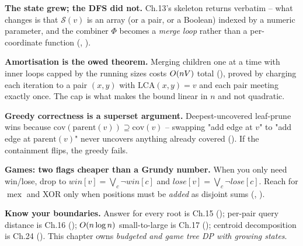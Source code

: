 \begin{quickref}
\textbf{The state grew; the DFS did not.} Ch.13's 
skeleton returns verbatim -- what changes is that $\mathcal S(v)$ is an
array (or a pair, or a Boolean) indexed by a numeric parameter, and the
combiner $\Phi$ becomes a \emph{merge loop} rather than a per-coordinate
function (, ).

\medskip
\textbf{Amortisation is the owed theorem.} Merging children one at a time
with inner loops capped by the running sizes costs $O(nV)$ total
(), proved by charging each iteration to a pair
$(x,y)$ with $\mathrm{LCA}(x,y) = v$ and each pair meeting exactly once.
The cap is what makes the bound linear in $n$ and not quadratic.

\medskip
\textbf{Greedy correctness is a superset argument.} Deepest-uncovered
leaf-prune wins because $\mathrm{cov}(\mathrm{parent}(v)) \supseteq
\mathrm{cov}(v)$ -- swapping "add edge at $v$" to "add edge at
$\mathrm{parent}(v)$" never uncovers anything already covered
(). If the containment flips, the greedy fails.

\medskip
\textbf{Games: two flags cheaper than a Grundy number.} When you only
need win/lose, drop to $\mathit{win}[v] = \bigvee_c \neg\mathit{win}[c]$
and $\mathit{lose}[v] = \bigvee_c \neg\mathit{lose}[c]$. Reach for
$\operatorname{mex}$ and XOR only when positions must be \emph{added}
as disjoint sums (, ).

\medskip
\textbf{Know your boundaries.} Answer for every root is Ch.15 ();
per-pair query distance is Ch.16 (); $O(n\log n)$
small-to-large is Ch.17 (); centroid decomposition is Ch.24
(). This chapter owns \emph{budgeted and game tree DP with
growing states}.
\end{quickref}


